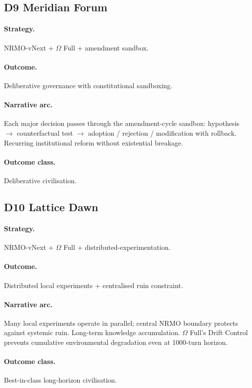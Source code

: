\subsection{D9 Meridian Forum}
\label{civ:d9}

\paragraph{Strategy.} NRMO-vNext + $\Omega$ Full + amendment
sandbox.
\paragraph{Outcome.} Deliberative governance with constitutional
sandboxing.
\paragraph{Narrative arc.}
Each major decision passes through the amendment-cycle
sandbox: hypothesis $\to$ counterfactual test $\to$ adoption /
rejection / modification with rollback. Recurring institutional
reform without existential breakage.
\paragraph{Outcome class.} Deliberative civilisation.

\subsection{D10 Lattice Dawn}
\label{civ:d10}

\paragraph{Strategy.} NRMO-vNext + $\Omega$ Full +
distributed-experimentation.
\paragraph{Outcome.} Distributed local experiments + centralised
ruin constraint.
\paragraph{Narrative arc.}
Many local experiments operate in parallel; central NRMO
boundary protects against systemic ruin. Long-term knowledge
accumulation. $\Omega$ Full's Drift Control prevents cumulative
environmental degradation even at 1000-turn horizon.
\paragraph{Outcome class.} Best-in-class long-horizon civilisation.

